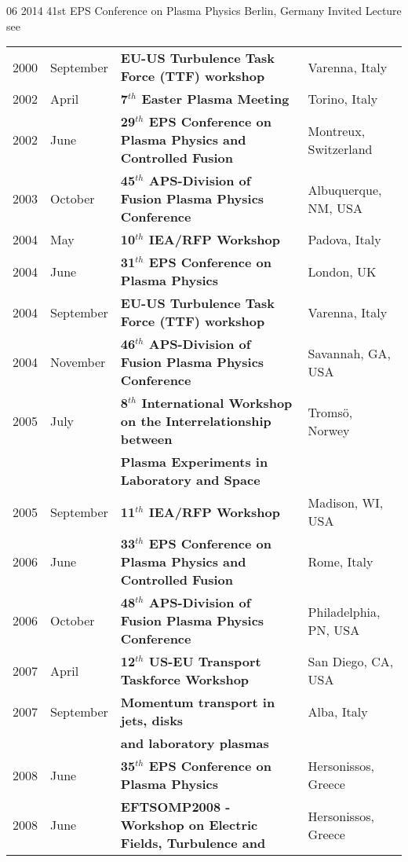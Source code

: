{\begin{entrylist}
\entry
{06 2014}
{41st EPS Conference on Plasma Physics}
{Berlin,  Germany}
{Invited Lecture see \cite{vianello:eps2014invito}}
\end{entrylist}
}{
\begin{longtable}{llll}
2000 & September & \textbf{EU-US Turbulence Task Force (TTF) workshop}
& Varenna, Italy \\
2002 & April & \textbf{7$^{th}$ Easter Plasma Meeting}& Torino, Italy
\\
2002 & June & \textbf{29$^{th}$ EPS Conference on Plasma Physics and
  Controlled Fusion} & Montreux, Switzerland \\
2003 & October & \textbf{45$^{th}$ APS-Division of Fusion Plasma
  Physics Conference}& Albuquerque, NM, USA \\
2004 & May & \textbf{10$^{th}$ IEA/RFP Workshop}& Padova, Italy \\
2004 & June & \textbf{31$^{th}$ EPS Conference on Plasma Physics} &
London, UK \\
2004 & September & \textbf{EU-US Turbulence Task Force (TTF) workshop}
& Varenna, Italy \\
2004 & November & \textbf{46$^{th}$ APS-Division of Fusion Plasma
  Physics Conference} & Savannah, GA, USA \\
2005 & July & \textbf{8$^{th}$ International Workshop on the
  Interrelationship between} & Troms\"o, Norwey \\
 & & \textbf{Plasma Experiments in Laboratory and
  Space} & \\
2005 & September & \textbf{11$^{th}$ IEA/RFP Workshop} & Madison, WI,
USA \\
2006 & June & \textbf{33$^{th}$ EPS Conference on Plasma Physics and
  Controlled Fusion} & Rome, Italy \\
2006 & October & \textbf{48$^{th}$ APS-Division of Fusion Plasma
  Physics Conference} & Philadelphia, PN, USA \\
2007 & April & \textbf{12$^{th}$ US-EU Transport Taskforce Workshop} &
San Diego, CA, USA \\
2007 & September & \textbf{Momentum transport in jets, disks} & Alba,
Italy \\
& & \textbf{ and laboratory plasmas} & \\
2008 & June & \textbf{35$^{th}$ EPS Conference on Plasma Physics} &
Hersonissos, Greece \\
2008 & June & \textbf{EFTSOMP2008 - Workshop on Electric Fields, Turbulence
                 and} & Hersonissos, Greece \\

\end{longtable}}
